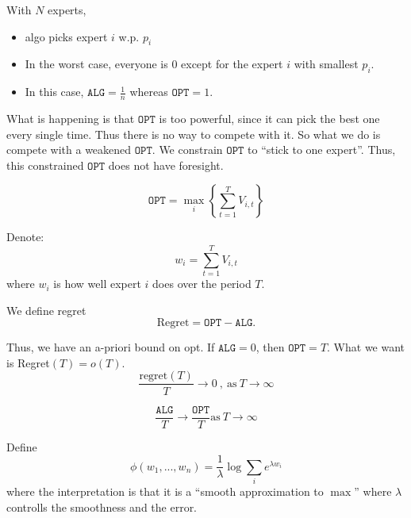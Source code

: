 With $N$ experts, 
\begin{itemize}
\item algo picks expert $i$ w.p. $p_{i}$
\item In the worst case, everyone is 0 except for the expert $i$ with smallest $p_{i}$. 
\item In this case, $\mathtt{ALG} = \frac{1}{n}$ whereas $\mathtt{OPT} = 1$.
\end{itemize}

What is happening is that $\mathtt{OPT}$ is too powerful, since it can pick the best one every single time.
Thus there is no way to compete with it.
So what we do is compete with a weakened $\mathtt{OPT}$.
We constrain $\mathtt{OPT}$ to ``stick to one expert''.
Thus, this constrained $\mathtt{OPT}$ does not have foresight.

\begin{equation}
  \label{eq:new-opt}
  \mathtt{OPT} = \max_{i} \left\{ \sum_{t=1}^{T} V_{i,t} \right\}
\end{equation}

Denote:
\begin{equation}
  \label{eq:wi}
  w_{i} = \sum_{t=1}^{T} V_{i,t}
\end{equation}
where $w_{i}$ is how well expert $i$ does over the period $T$.

We define regret
\begin{equation}
  \label{eq:regret}
  \mbox{Regret} = \mathtt{OPT} - \mathtt{ALG}.
\end{equation}

Thus, we have an a-priori bound on opt.
If $\mathtt{ALG} = 0$, then $\mathtt{OPT} = T$.
What we want is Regret$(T) = o(T)$.
\begin{equation}
  \label{eq:regret-behaviour}
  \frac{\mbox{regret}(T)}{T} \rightarrow 0 ~,~ \mbox{as}~ T \rightarrow \infty
\end{equation}

\begin{equation}
  \label{eq:alg_opt}
\frac{\mathtt{ALG}}{T} \rightarrow \frac{\mathtt{OPT}}{T} \mbox{as}~ T \rightarrow \infty
\end{equation}

Define
\begin{equation}
  \label{eq:phifn}
  \phi(w_{1},...,w_{n}) = \frac{1}{\lambda} \log \sum_{i} e^{\lambda w_{i}}
\end{equation}
where the interpretation is that it is a ``smooth approximation to $\max$'' where $\lambda$ controlls the smoothness and the error.

